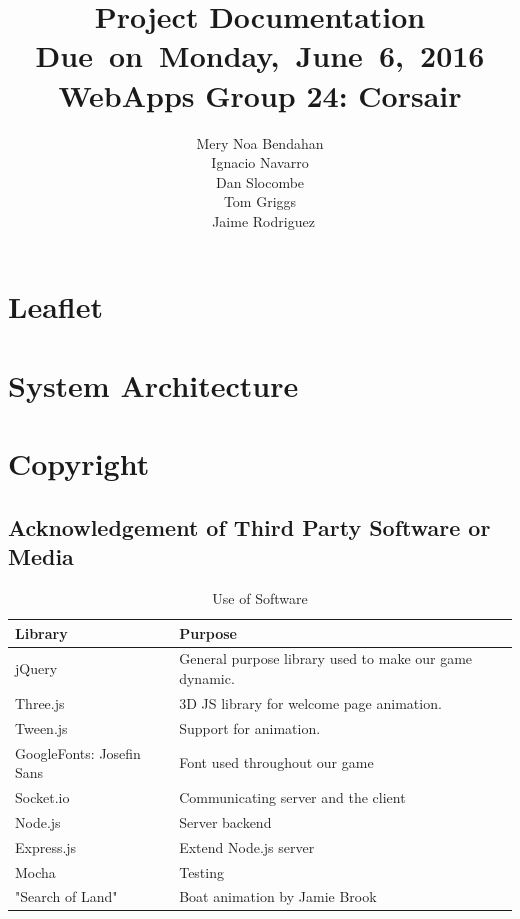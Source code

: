 \documentclass{article}
\title{
\vspace{2in}
\textmd{\textbf{Project Documentation}}\\
\normalsize\vspace{0.1in}\small{Due\ on\ Monday,\ June\ 6,\ 2016}\\
\vspace{0.1in}\large{\textbf{WebApps Group 24: Corsair}}
\vspace{3in}
}
\author{Mery Noa Bendahan \\ Ignacio Navarro \\ Dan Slocombe \\ Tom Griggs \\ Jaime Rodriguez}
\date{}
\renewcommand{\_}{\char`_}
\begin{document}
\maketitle
\newpage


\section{Leaflet}
\clearpage
\section{System Architecture}
\clearpage
\section{Copyright}

\subsection{Acknowledgement of Third Party Software or Media}

\begin{table}[H]
\centering
\caption{Use of Software}
\label{my-label}
\begin{tabular}{|l|l|}
\hline
\textbf{Library}         & \textbf{Purpose}                                        \\ \hline
jQuery                    & General purpose library used to make our game dynamic. \\ \hline
Three.js                  & 3D JS library for welcome page animation.              \\ \hline
Tween.js                  & Support for animation.                                 \\ \hline
GoogleFonts: Josefin Sans & Font used throughout our game                          \\ \hline
Socket.io                 & Communicating server and the client                    \\ \hline
Node.js                   & Server backend                                         \\ \hline
Express.js                & Extend Node.js server                                  \\ \hline
Mocha                     & Testing                                                \\ \hline
"Search of Land"          & Boat animation by Jamie Brook                               \\ \hline
\end{tabular}
\end{table}
\end{document}
